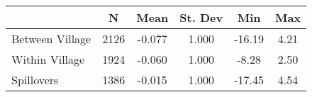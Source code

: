 \begin{tabular}{l*{5}{c}}\hline&\multicolumn{1}{c}{N}&\multicolumn{1}{c}{Mean}&\multicolumn{1}{c}{St. Dev}&\multicolumn{1}{c}{Min}&\multicolumn{1}{c}{Max}\\ \hline 
Between Village & 2126 & -0.077 & 1.000 & -16.19 & 4.21 \\
Within Village & 1924 & -0.060 & 1.000 & -8.28 & 2.50 \\
Spillovers & 1386 & -0.015 & 1.000 & -17.45 & 4.54 \\
\hline \end{tabular}
